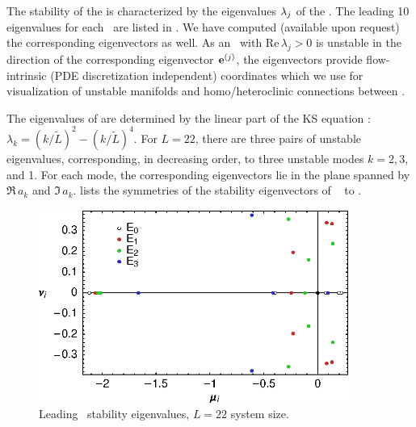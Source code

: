 The stability of the {\eqva} is characterized by the eigenvalues
$\eigExp[j]$ of the \stabmat.  The leading 10 eigenvalues for each
\eqv\ are listed in . We have computed (available upon request)
the corresponding eigenvectors as well. As an \eqv\ with $\mathrm{Re}\,
\lambda_j > 0$ is unstable in the direction of the corresponding
eigenvector $\jEigvec{j}$, the eigenvectors provide flow-intrinsic
(PDE discretization independent) coordinates which we use for visualization
of unstable manifolds and homo/heteroclinic connections between
\eqva.

The eigenvalues of  are determined by the linear part of the KS
equation : $\lambda_k=(k/\tilde{L})^2-(k/\tilde{L})^4$.
For $L=22$, there are three pairs of unstable eigenvalues, corresponding,
in decreasing order, to three unstable modes $k=2,3$, and 1.  For each
mode, the corresponding eigenvectors lie in the plane spanned by
$\Re \, a_k$ and $\Im \, a_k$. 
lists the symmetries of the stability eigenvectors of
\eqva\  to .

\begin{figure}[t]
\begin{center}
\includegraphics[width=4in]{figs/L22-eqvaEigenvalues.eps}
\end{center}
\caption{
Leading  \eqv\ stability eigenvalues,
$L=22$ system size.
}
\label{f:KS22EkEigs}
\end{figure}


